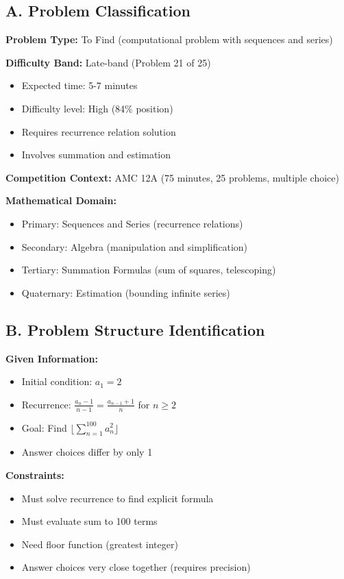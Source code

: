 \documentclass[12pt]{article}
\begin{document}
\begin{problemconfigbox}

\subsection*{A. Problem Classification}

\textbf{Problem Type:} To Find (computational problem with sequences and series)

\textbf{Difficulty Band:} Late-band (Problem 21 of 25)
\begin{itemize}
    \item Expected time: 5-7 minutes
    \item Difficulty level: High (84\% position)
    \item Requires recurrence relation solution
    \item Involves summation and estimation
\end{itemize}

\textbf{Competition Context:} AMC 12A (75 minutes, 25 problems, multiple choice)

\textbf{Mathematical Domain:} 
\begin{itemize}
    \item Primary: Sequences and Series (recurrence relations)
    \item Secondary: Algebra (manipulation and simplification)
    \item Tertiary: Summation Formulas (sum of squares, telescoping)
    \item Quaternary: Estimation (bounding infinite series)
\end{itemize}

\subsection*{B. Problem Structure Identification}

\textbf{Given Information:}
\begin{itemize}
    \item Initial condition: $a_1 = 2$
    \item Recurrence: $\frac{a_n -1}{n-1}=\frac{a_{n-1}+1}{n}$ for $n \geq 2$
    \item Goal: Find $\lfloor \sum_{n=1}^{100} a_n^2 \rfloor$
    \item Answer choices differ by only 1
\end{itemize}

\textbf{Constraints:}
\begin{itemize}
    \item Must solve recurrence to find explicit formula
    \item Must evaluate sum to 100 terms
    \item Need floor function (greatest integer)
    \item Answer choices very close together (requires precision)
\end{itemize}


\end{problemconfigbox}
\end{document}
